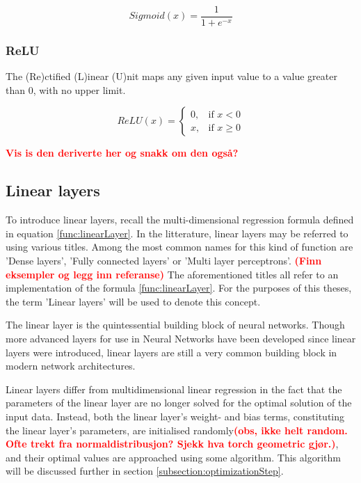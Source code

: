 \[
    Sigmoid(x) =  \frac{1}{1 + e^{-x}}
    \tag{2.6} \label{func:sigmoid}
\]

\subsubsection{ReLU}

The (Re)ctified (L)inear (U)nit maps any given input value to a value greater than 0, with no upper limit.

\[
    ReLU(x) =
    \begin{cases}
        0,& \text{if } x < 0\\
        x,& \text{if } x\ge 0
    \end{cases}
    \tag{2.7} \label{func:relu}
\]

\textcolor{red}{\textbf{Vis is den deriverte her og snakk om den også?}}





\subsection{Linear layers}
\label{subsection:linearLayers}

To introduce linear layers, recall the multi-dimensional regression formula defined in equation \ref{func:linearLayer}.
In the litterature, linear layers may be referred to using various titles. 
Among the most common names for this kind of function are 'Dense layers', 'Fully connected layers' or 'Multi layer perceptrons'.
\textcolor{red}{\textbf{(Finn eksempler og legg inn referanse)}}
The aforementioned titles all refer to an implementation of the formula \ref{func:linearLayer}. 
For the purposes of this theses, the term 'Linear layers' will be used to denote this concept.

The linear layer is the quintessential building block of neural networks. 
Though more advanced layers for use in Neural Networks have been developed since linear layers were introduced, 
linear layers are still a very common building block in modern network architectures. 

Linear layers differ from multidimensional linear regression in the fact that the parameters of the linear layer are no 
longer solved for the optimal solution of the input data.
Instead, both the linear layer's weight- and bias terms, constituting the linear layer's parameters, are initialised randomly\textbf{\textcolor{red}{(obs, ikke helt random. Ofte trekt fra normaldistribusjon? Sjekk hva torch geometric gjør.)}}, 
and their optimal values are approached using some algorithm. This algorithm will be discussed further in section \ref{subsection:optimizationStep}.





